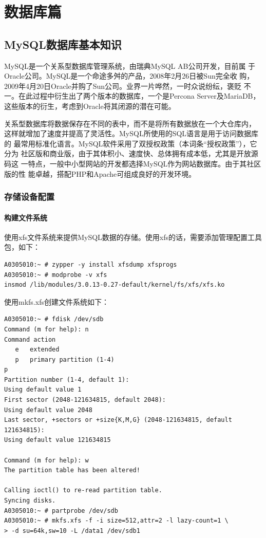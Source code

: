 \part{数据库篇}
\chapter{MySQL数据库基本知识}

MySQL是一个关系型数据库管理系统，由瑞典MySQL AB公司开发，目前属
于Oracle公司。MySQL是一个命途多舛的产品，2008年2月26日被Sun完全收
购，2009年4月20日Oracle并购了Sun公司。业界一片哗然，一时众说纷纭，褒贬
不一。在此过程中衍生出了两个版本的数据库，一个是Percona
Server及MariaDB，这些版本的衍生，考虑到Oracle将其闭源的潜在可能。

关系型数据库将数据保存在不同的表中，而不是将所有数据放在一个大仓库内，
这样就增加了速度并提高了灵活性。MySQL所使用的SQL语言是用于访问数据库的
最常用标准化语言。MySQL软件采用了双授权政策（本词条“授权政策”），它分为
社区版和商业版，由于其体积小、速度快、总体拥有成本低，尤其是开放源码这
一特点，一般中小型网站的开发都选择MySQL作为网站数据库。由于其社区版的性
能卓越，搭配PHP和Apache可组成良好的开发环境。

\section{存储设备配置}

\subsection{构建文件系统}

使用xfs文件系统来提供MySQL数据的存储。使用xfs的话，需要添加管理配置工具
包，如下：

\begin{verbatim}
A0305010:~ # zypper -y install xfsdump xfsprogs   
A0305010:~ # modprobe -v xfs 
insmod /lib/modules/3.0.13-0.27-default/kernel/fs/xfs/xfs.ko
\end{verbatim}


使用mkfs.xfs创建文件系统如下：

\begin{verbatim}
A0305010:~ # fdisk /dev/sdb
Command (m for help): n
Command action
   e   extended
   p   primary partition (1-4)
p
Partition number (1-4, default 1): 
Using default value 1
First sector (2048-121634815, default 2048): 
Using default value 2048
Last sector, +sectors or +size{K,M,G} (2048-121634815, default 121634815): 
Using default value 121634815

Command (m for help): w
The partition table has been altered!

Calling ioctl() to re-read partition table.
Syncing disks.
A0305010:~ # partprobe /dev/sdb
A0305010:~ # mkfs.xfs -f -i size=512,attr=2 -l lazy-count=1 \
> -d su=64k,sw=10 -L /data1 /dev/sdb1
\end{verbatim}

